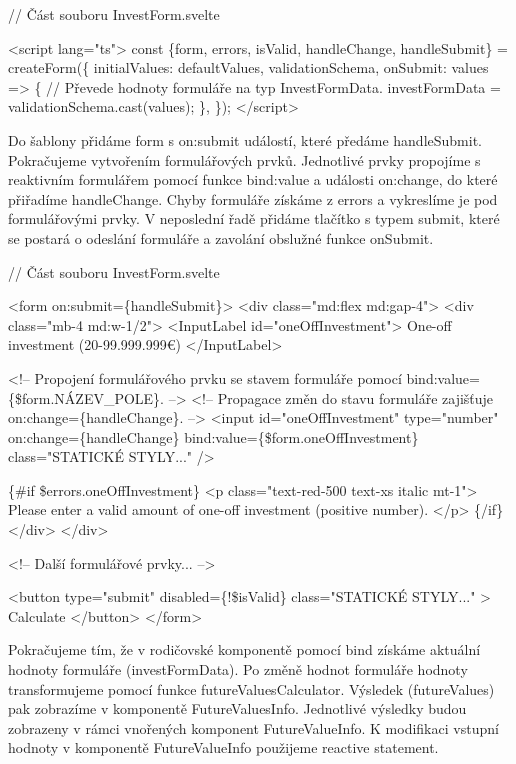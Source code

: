 \begin{prog}
// Část souboru InvestForm.svelte

<script lang="ts">
  const \{form, errors, isValid, handleChange, handleSubmit\} = createForm(\{
    initialValues: defaultValues,
    validationSchema,
    onSubmit: values => \{
      // Převede hodnoty formuláře na typ InvestFormData.
      investFormData = validationSchema.cast(values);
    \},
  \});
</script>
\end{prog}

Do šablony přidáme form s on:submit událostí, které předáme handleSubmit. Pokračujeme vytvořením formulářových prvků. 
Jednotlivé prvky propojíme s reaktivním formulářem pomocí funkce bind:value a události on:change, do které přiřadíme handleChange. Chyby formuláře získáme z errors a vykreslíme je pod formulářovými prvky. 
V neposlední řadě přidáme tlačítko s typem submit, které se postará o odeslání formuláře a zavolání obslužné funkce onSubmit.

\begin{prog}
// Část souboru InvestForm.svelte

<form on:submit=\{handleSubmit\}>
  <div class="md:flex md:gap-4">
    <div class="mb-4 md:w-1/2">
      <InputLabel id="oneOffInvestment">
        One-off investment (20-99.999.999€)
      </InputLabel>

      <!-- Propojení formulářového prvku se stavem formuláře
        pomocí bind:value=\{\$form.NÁZEV_POLE\}. -->
      <!-- Propagace změn do stavu formuláře 
        zajišťuje on:change=\{handleChange\}. -->
      <input
        id="oneOffInvestment"
        type="number"
        on:change=\{handleChange\}
        bind:value=\{\$form.oneOffInvestment\}
        class="STATICKÉ STYLY..."
      />

      \{#if \$errors.oneOffInvestment\}
        <p class="text-red-500 text-xs italic mt-1">
          Please enter a valid amount of one-off investment (positive number).
        </p>
      \{/if\}
    </div>
  </div>

  <!-- Další formulářové prvky... -->

  <button
    type="submit"
    disabled=\{!\$isValid\}
    class="STATICKÉ STYLY..."
  >
    Calculate
  </button>
</form>
\end{prog}

Pokračujeme tím, že v rodičovské komponentě pomocí bind získáme aktuální hodnoty formuláře (investFormData). Po změně hodnot formuláře hodnoty transformujeme pomocí funkce futureValuesCalculator. 
Výsledek (futureValues) pak zobrazíme v komponentě FutureValuesInfo. Jednotlivé výsledky budou zobrazeny v rámci vnořených komponent FutureValueInfo. 
K modifikaci vstupní hodnoty v komponentě FutureValueInfo použijeme reactive statement.


